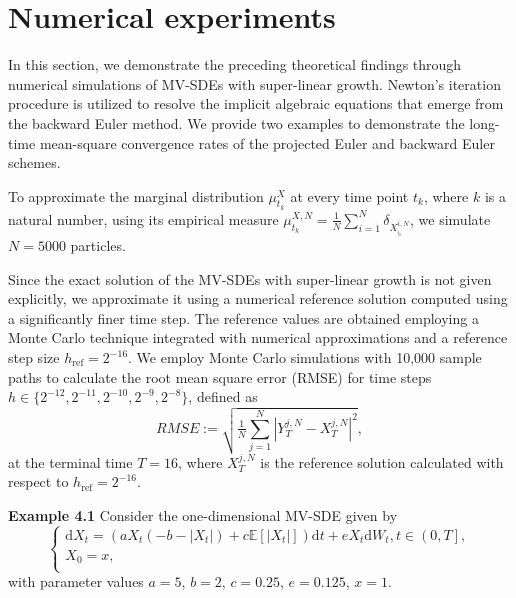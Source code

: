 \documentclass[12pt]{article}
\numberwithin{equation}{section}
\begin{document}
\section{Numerical experiments}
\label{numerical_experiments}
In this section, we demonstrate the preceding theoretical findings through numerical simulations of MV-SDEs with super-linear growth. Newton's iteration procedure is utilized to resolve the implicit algebraic equations that emerge from the backward Euler method. We provide two examples to demonstrate the long-time mean-square convergence rates of the projected Euler and backward Euler schemes.

To approximate the marginal distribution $\mu _{t_k}^{X}$ at every time point $t_k$,  where $k$ is a natural number, using its empirical measure $
\mu _{t_k}^{X,N}=\frac{1}{N}\sum_{i=1}^N{\delta _{X_{_{t_k}}^{i,N}}}
$, we simulate    $N=5000$ particles.

Since the exact solution of the MV-SDEs with super-linear growth is not given explicitly, we approximate it using a numerical reference solution computed using a significantly finer time step. The reference values are obtained employing a Monte Carlo technique integrated with numerical approximations and a reference step size $ h_{\text{ref}} = 2^{-16} $. We employ Monte Carlo simulations with 10,000 sample paths to calculate the root mean square error (RMSE) for time steps $ h \in \{ 2^{-12}, 2^{-11}, 2^{-10}, 2^{-9}, 2^{-8} \} $, defined as
\begin{equation}\tag{4.1}\label{7.1}
RMSE:=\sqrt{\tfrac{1}{N}\sum_{j=1}^N{\left| Y_{T}^{j,N}-X_{T}^{j,N} \right|^2}},
\end{equation}
at the terminal time $ T = 16 $, where $ X_T^{j,N} $ is the reference solution calculated with respect to $ h_{\text{ref}} = 2^{-16} $.

\smallskip
\noindent 
\textbf{Example 4.1}  Consider the one-dimensional MV-SDE given by 
\begin{equation*}\tag{4.2}\label{7.2}
\begin{cases}
	\mathrm{d}X_t=\left( aX_t\left( -b-\left|X_t\right| \right) +c\mathbb{E} \left[ \left|X_t\right| \right] \right) \mathrm{d}t+eX_t\mathrm{d}W_t, t\in \left( 0,T \right] ,\\
	X_0=x,\\
\end{cases}
\end{equation*}
with parameter values $a=5$, $b=2$, $c=0.25$, $e=0.125$, $x=1$.
\end{document}

